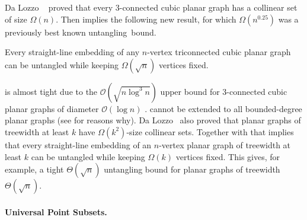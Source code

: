 Da Lozzo \etal~\cite{dalozzo.dujmovic.ea:drawing}  proved that
every 3-connected cubic planar graph has a collinear set of size
$\Omega(n)$. Then  implies the following new result,
for which $\Omega(n^{0.25})$ was a previously best known \mbox{untangling
bound.}

\begin{cor}
Every straight-line embedding of any $n$-vertex triconnected cubic planar
graph can be untangled while keeping $\Omega(\sqrt{n})$ vertices fixed.
\end{cor}

 is almost tight due to the $\mathcal{O}(\sqrt{n\log^3n })$ upper bound for 3-connected cubic planar graphs of diameter $\mathcal{O}(\log n)$ \cite{c-upg-10}.  cannot be extended to all bounded-degree planar graphs (see \cite{dujmovic:utility,DBLP:journals/dm/Owens81} for
reasons why).  Da Lozzo \etal\ also proved that planar graphs of treewidth at least
$k$ have $\Omega(k^2)$-size collinear sets. Together with
  that implies that 
%
every straight-line embedding of an $n$-vertex planar graph of treewidth
at least $k$ can be untangled while keeping $\Omega(k)$ vertices fixed. 
%
This gives, for example, a tight $\Theta(\sqrt{n})$
untangling bound for planar graphs of treewidth
$\Theta(\sqrt{n})$.  



 \paragraph{Universal Point Subsets.}%


